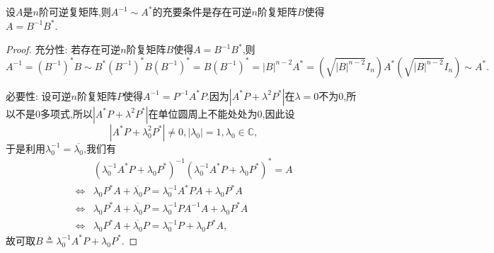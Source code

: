 \documentclass[../../main.tex]{subfiles}
\begin{document}
\begin{theorem}[]\label{theorem:}
设\( A \)是\( n \)阶可逆复矩阵,则\( A^{-1} \sim A^* \)的充要条件是存在可逆\( n \)阶复矩阵\( B \)使得\( A = B^{-1} B^* \).
\end{theorem}
\begin{proof}
{\heiti 充分性:} 若存在可逆\( n \)阶复矩阵\( B \)使得\( A = B^{-1} B^* \),则
\[
A^{-1}=(B^{-1})^*B\sim B^*(B^{-1})^*B(B^{-1})^*=B(B^{-1})^*=\left| B \right|^{n-2}A^*=\left( \sqrt{\left| B \right|^{n-2}}I_n \right) A^*\left( \sqrt{\left| B \right|^{n-2}}I_n \right) \sim A^*.
\]

{\heiti 必要性:} 设可逆\( n \)阶复矩阵\( P \)使得\( A^{-1} = P^{-1} A^* P \).因为\( |A^* P + \lambda^2 P^*| \)在\( \lambda = 0 \)不为0,所以不是0多项式,所以\( |A^* P + \lambda^2 P^*| \)在单位圆周上不能处处为0,因此设
\[
|A^* P + \lambda_0^2 P^*| \neq 0, |\lambda_0| = 1, \lambda_0 \in \mathbb{C},
\]
于是利用\( \lambda_0^{-1} = \overline{\lambda_0} \),我们有
\[
\begin{aligned}
& (\lambda_0^{-1} A^* P + \lambda_0 P^*)^{-1} (\lambda_0^{-1} A^* P + \lambda_0 P^*)^* = A \\
\iff  & \lambda_0 P^* A + \overline{\lambda_0} P = \lambda_0^{-1} A^* P A + \lambda_0 P^* A \\
\iff  & \lambda_0 P^* A + \overline{\lambda_0} P = \lambda_0^{-1} P A^{-1} A + \lambda_0 P^* A \\
\iff  & \lambda_0 P^* A + \overline{\lambda_0} P = \lambda_0^{-1} P + \lambda_0 P^* A,
\end{aligned}
\]
故可取\( B \triangleq \lambda_0^{-1} A^* P + \lambda_0 P^* \).

\end{proof}
\end{document}
